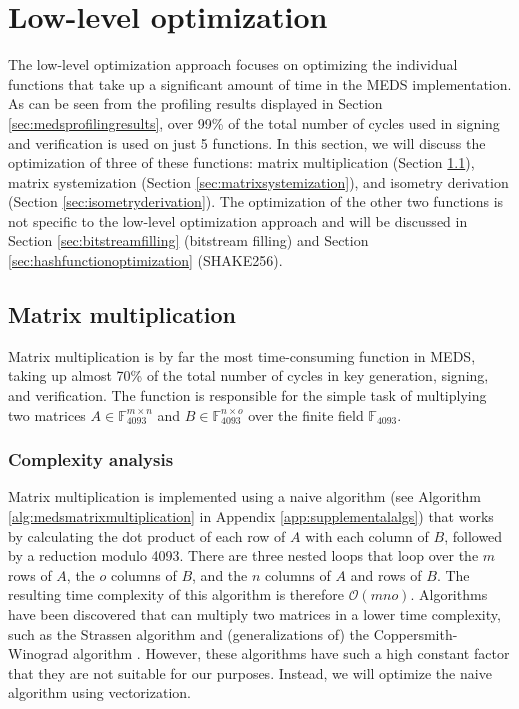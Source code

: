 \documentclass[11pt,a4paper]{report}
\theoremstyle{definition}
\begin{document}
\section{Low-level optimization}
\label{sec:lowleveloptimization}
The low-level optimization approach focuses on optimizing the individual functions that take up a significant amount of time in the MEDS implementation. As can be seen from the profiling results displayed in Section \ref{sec:medsprofilingresults}, over 99\% of the total number of cycles used in signing and verification is used on just 5 functions. In this section, we will discuss the optimization of three of these functions: matrix multiplication (Section \ref{sec:matrixmultiplication}), matrix systemization (Section \ref{sec:matrixsystemization}), and isometry derivation (Section \ref{sec:isometryderivation}). The optimization of the other two functions is not specific to the low-level optimization approach and will be discussed in Section \ref{sec:bitstreamfilling} (bitstream filling) and Section \ref{sec:hashfunctionoptimization} (SHAKE256).

\subsection{Matrix multiplication}
\label{sec:matrixmultiplication}
Matrix multiplication is by far the most time-consuming function in MEDS, taking up almost 70\% of the total number of cycles in key generation, signing, and verification. The function is responsible for the simple task of multiplying two matrices $A \in \mathbb{F}_{4093}^{m \times n}$ and $B \in \mathbb{F}_{4093}^{n \times o}$ over the finite field $\mathbb{F}_{4093}$.

\subsubsection{Complexity analysis}
\label{sec:matrixmultiplicationcomplexity}
Matrix multiplication is implemented using a naive algorithm (see Algorithm \ref{alg:medsmatrixmultiplication} in Appendix \ref{app:supplementalalgs}) that works by calculating the dot product of each row of $A$ with each column of $B$, followed by a reduction modulo 4093. There are three nested loops that loop over the $m$ rows of $A$, the $o$ columns of $B$, and the $n$ columns of $A$ and rows of $B$. The resulting time complexity of this algorithm is therefore $\mathcal{O}(mno)$. Algorithms have been discovered that can multiply two matrices in a lower time complexity, such as the Strassen algorithm \cite{strassen1969gaussian} and (generalizations of) the Coppersmith-Winograd algorithm \cite{coppersmith1987matrix}. However, these algorithms have such a high constant factor that they are not suitable for our purposes. Instead, we will optimize the naive algorithm using vectorization.
\end{document}
